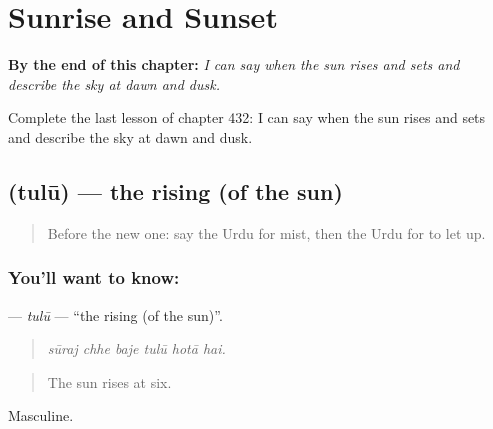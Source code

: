
\chapter{Sunrise and Sunset}
\label{ch:ur-sunrise-and-sunset}

\begin{chapteropening}
\textbf{By the end of this chapter:} \emph{I can say when the sun rises and sets and describe the sky at dawn and dusk.}

Complete the last lesson of chapter 432: I can say when the sun rises and sets and describe the sky at dawn and dusk.
\end{chapteropening}

\section[\texorpdfstring{\ur{طلوع} (tulū)}{طلوع (tulū)}]{ (tulū) — the rising (of the sun)}

\label{lesson:UR-C432-tulu}



\begin{quote}
Before the new one: say the Urdu for mist, then the Urdu for to let up.
\end{quote}

\subsection*{You'll want to know: }
\textbf{} — \emph{tulū} — \textquotedblleft{}the rising (of the sun)\textquotedblright{}.

\begin{quote}
     
\end{quote}

\begin{quote}
\emph{sūraj chhe baje tulū hotā hai.}
\end{quote}

\begin{quote}
The sun rises at six.
\end{quote}

Masculine.

